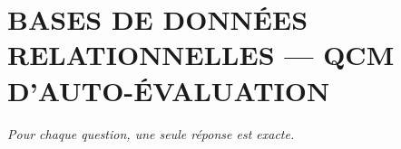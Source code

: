 
\section*{\textcolor{chapcolor}{\MakeUppercase{Bases de données relationnelles — QCM d'auto-évaluation}}}

\begin{center}
\textit{Pour chaque question, une seule réponse est exacte.}
\end{center}

